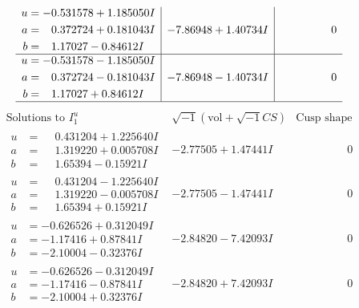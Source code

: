\documentclass[1p]{elsarticle_modified}
\theoremstyle{definition}
\newcommand{\I}{\sqrt{-1}}
\begin{document}
$$\begin{array}{c|c|c}
\begin{aligned}
u &= -0.531578 + 1.185050 I \\
a &= \phantom{-}0.372724 + 0.181043 I \\
b &= \phantom{-}1.17027 - 0.84612 I\end{aligned}
 & -7.86948 + 1.40734 I & \phantom{-0.000000 } 0 \\ \hline\begin{aligned}
u &= -0.531578 - 1.185050 I \\
a &= \phantom{-}0.372724 - 0.181043 I \\
b &= \phantom{-}1.17027 + 0.84612 I\end{aligned}
 & -7.86948 - 1.40734 I & \phantom{-0.000000 } 0\\
 \hline 
 \end{array}$$\newpage$$\begin{array}{c|c|c}  
\text{Solutions to }I^u_{1}& \I (\text{vol} + \sqrt{-1}CS) & \text{Cusp shape}\\
 \hline 
\begin{aligned}
u &= \phantom{-}0.431204 + 1.225640 I \\
a &= \phantom{-}1.319220 + 0.005708 I \\
b &= \phantom{-}1.65394 - 0.15921 I\end{aligned}
 & -2.77505 + 1.47441 I & \phantom{-0.000000 } 0 \\ \hline\begin{aligned}
u &= \phantom{-}0.431204 - 1.225640 I \\
a &= \phantom{-}1.319220 - 0.005708 I \\
b &= \phantom{-}1.65394 + 0.15921 I\end{aligned}
 & -2.77505 - 1.47441 I & \phantom{-0.000000 } 0 \\ \hline\begin{aligned}
u &= -0.626526 + 0.312049 I \\
a &= -1.17416 + 0.87841 I \\
b &= -2.10004 - 0.32376 I\end{aligned}
 & -2.84820 - 7.42093 I & \phantom{-0.000000 } 0 \\ \hline\begin{aligned}
u &= -0.626526 - 0.312049 I \\
a &= -1.17416 - 0.87841 I \\
b &= -2.10004 + 0.32376 I\end{aligned}
 & -2.84820 + 7.42093 I & \phantom{-0.000000 } 0 \\ \hline\begin{aligned}

\end{aligned}
\end{array}$$
\end{document}
